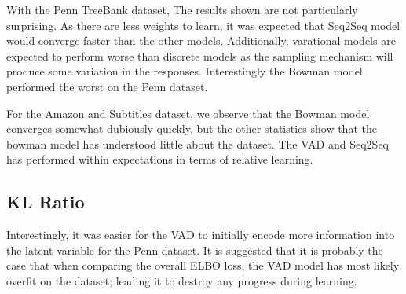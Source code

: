 \documentclass[12pt,twoside]{report}
\begin{document}
With the Penn TreeBank dataset, The results shown are not particularly surprising. As there are less weights to learn, it was expected that Seq2Seq model would converge faster than the other models. Additionally, varational models are expected to perform worse than discrete models as the sampling mechanism will produce some variation in the responses. Interestingly the Bowman model performed the worst on the Penn dataset.

For the Amazon and Subtitles dataset, we observe that the Bowman model converges somewhat dubiously  quickly, but the other statistics show that the bowman model has understood little about the dataset. The VAD and Seq2Seq has performed within expectations in terms of relative learning.


	


\subsection{KL Ratio}

Interestingly, it was easier for the VAD to initially encode more information into the latent variable for the Penn dataset. It is suggested that it is probably the case that when comparing the overall ELBO loss, the VAD model has most likely overfit on the dataset; leading it to destroy any progress during learning.
\end{document}
